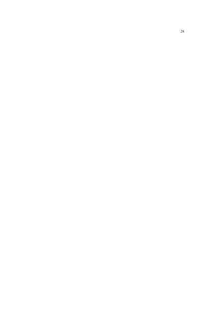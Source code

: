 \begin{figure}[p]
	\centering 
	\includegraphics[scale=0.7]{capitulos/resolucoes/cuni414/cuni414-28.pdf}
\end{figure}

